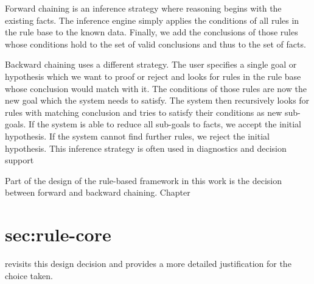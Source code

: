 Forward chaining is an inference strategy where reasoning begins with the existing facts.
The inference engine simply applies the conditions of all rules in the rule base to the known data.
Finally,
we add the conclusions of those rules
whose conditions hold to the set of valid conclusions and thus to the set of facts.

Backward chaining uses a different strategy\cite{al2015comparison}.
The user specifies a single goal or hypothesis
which we want to proof or reject and looks for rules in the rule base whose conclusion would match with it.
The conditions of those rules are now the new goal which the system needs to satisfy.
The system then recursively looks for rules with matching conclusion
and tries to satisfy their conditions as new sub-goals.
If the system is able to reduce all sub-goals to facts, we accept the initial hypothesis.
If the system cannot find further rules, we reject the initial hypothesis.
This inference strategy is often used in diagnostics and decision support\cite{https://doi.org/10.1002/widm.11}

Part of the design of the rule-based framework in this work is the decision between forward and backward chaining.
Chapter \section{sec:rule-core} revisits this design decision
and provides a more detailed justification for the choice taken.
